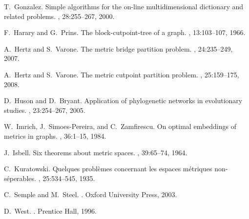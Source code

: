 \documentclass[12pt]{article}
\begin{document}
\begin{thebibliography}{10}
T.~Gonzalez.
\newblock Simple algorithms for the on-line multidimensional dictionary and
  related problems.
, 28:255--267, 2000.

F.~Harary and G.~Prins.
\newblock The block-cutpoint-tree of a graph.
, 13:103--107, 1966.

A.~Hertz and S.~Varone.
\newblock The metric bridge partition problem.
, 24:235--249, 2007.

A.~Hertz and S.~Varone.
\newblock The metric cutpoint partition problem.
, 25:159--175, 2008.

D.~Huson and D.~Bryant.
\newblock Application of phylogenetic networks in evolutionary studies.
, 23:254--267, 2005.

W.~Imrich, J.~Simoes-Pereira, and C.~Zamfirescu.
\newblock On optimal embeddings of metrics in graphs.
, 36:1--15, 1984.

J.~Isbell.
\newblock Six theorems about metric spaces.
, 39:65--74, 1964.

C.~Kuratowski.
\newblock Quelques probl\`emes concernant les espaces m\'etriques
  non-s\'eperables.
, 25:534--545, 1935.

C.~Semple and M.~Steel.
.
\newblock Oxford University Press, 2003.

D.~West.
.
\newblock Prentice Hall, 1996.

\end{thebibliography}
\end{document}
